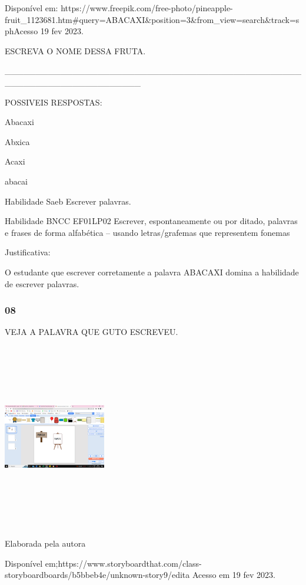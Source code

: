 Disponível
em: https://www.freepik.com/free-photo/pineapple-fruit\_1123681.htm\#query=ABACAXI\&position=3\&from\_view=search\&track=sphAcesso
19 fev 2023.

ESCREVA O NOME DESSA FRUTA.

\_\_\_\_\_\_\_\_\_\_\_\_\_\_\_\_\_\_\_\_\_\_\_\_\_\_\_\_\_\_\_\_\_\_\_\_\_\_\_\_\_\_\_\_\_\_\_\_\_\_\_\_\_\_\_\_\_\_\_\_\_\_\_\_\_\_\_\_\_\_

\protect\hypertarget{_heading=h.3fwokq0}{}{}POSSIVEIS RESPOSTAS:

Abacaxi

Abxica

Acaxi

abacai

Habilidade Saeb Escrever palavras.

\protect\hypertarget{_heading=h.1v1yuxt}{}{}Habilidade BNCC EF01LP02
Escrever, espontaneamente ou por ditado, palavras e frases de forma
alfabética -- usando letras/grafemas que representem fonemas

Justificativa:

O estudante que escrever corretamente a palavra ABACAXI domina a
habilidade de escrever palavras.

\subsubsection{08}\label{section-33}

VEJA A PALAVRA QUE GUTO ESCREVEU.

\includegraphics[width=1.76042in,height=3.19514in]{media/image197.png}

Elaborada pela autora

Disponível
em;https://www.storyboardthat.com/class-storyboardboards/b5bbeb4e/unknown-story9/edita
Acesso em 19 fev 2023.

